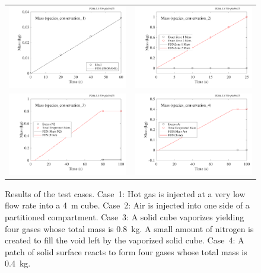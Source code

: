 \documentclass[11pt]{book}
\begin{document}
\begin{figure}[h]
\begin{tabular*}{\textwidth}{lr}
\includegraphics[width=3.2in]{SCRIPT_FIGURES/species_conservation_1} &
\includegraphics[width=3.2in]{SCRIPT_FIGURES/species_conservation_2} \\
\includegraphics[width=3.2in]{SCRIPT_FIGURES/species_conservation_3} &
\includegraphics[width=3.2in]{SCRIPT_FIGURES/species_conservation_4}
\end{tabular*}
\caption[The  test cases]{Results of the  test cases. Case~1: Hot gas is injected at a very low flow rate into a 4~m cube. Case~2: Air is injected into one side of a partitioned compartment. Case~3: A solid cube vaporizes yielding four gases whose total mass is 0.8~kg. A small amount of nitrogen is created to fill the void left by the vaporized solid cube. Case~4: A patch of solid surface reacts to form four gases whose total mass is 0.4~kg.}
\label{species_conservation}
\end{figure}
\end{document}
